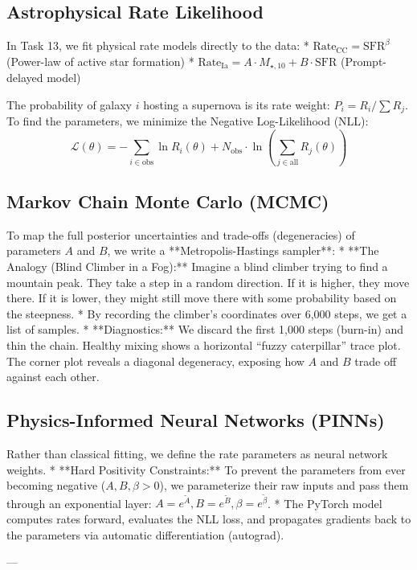 \documentclass[11pt,a4paper]{article}
\begin{document}
\subsection{Astrophysical Rate Likelihood}
In Task 13, we fit physical rate models directly to the data:
*   $\text{Rate}_{\text{CC}} = \text{SFR}^\beta$ (Power-law of active star formation)
*   $\text{Rate}_{\text{Ia}} = A \cdot M_{\star, 10} + B \cdot \text{SFR}$ (Prompt-delayed model)

The probability of galaxy $i$ hosting a supernova is its rate weight: $P_i = R_i / \sum R_j$.
To find the parameters, we minimize the Negative Log-Likelihood (NLL):
$$\mathcal{L}(\theta) = -\sum_{i \in \text{obs}} \ln R_i(\theta) + N_{\text{obs}} \cdot \ln \left(\sum_{j \in \text{all}} R_j(\theta)\right)$$

\subsection{Markov Chain Monte Carlo (MCMC)}
To map the full posterior uncertainties and trade-offs (degeneracies) of parameters $A$ and $B$, we write a **Metropolis-Hastings sampler**:
*   **The Analogy (Blind Climber in a Fog):** Imagine a blind climber trying to find a mountain peak. They take a step in a random direction. If it is higher, they move there. If it is lower, they might still move there with some probability based on the steepness.
*   By recording the climber's coordinates over 6,000 steps, we get a list of samples. 
*   **Diagnostics:** We discard the first 1,000 steps (burn-in) and thin the chain. Healthy mixing shows a horizontal ``fuzzy caterpillar'' trace plot. The corner plot reveals a diagonal degeneracy, exposing how $A$ and $B$ trade off against each other.

\subsection{Physics-Informed Neural Networks (PINNs)}
Rather than classical fitting, we define the rate parameters as neural network weights. 
*   **Hard Positivity Constraints:** To prevent the parameters from ever becoming negative ($A, B, \beta > 0$), we parameterize their raw inputs and pass them through an exponential layer: $A = e^{\tilde{A}}, B = e^{\tilde{B}}, \beta = e^{\tilde{\beta}}$.
*   The PyTorch model computes rates forward, evaluates the NLL loss, and propagates gradients back to the parameters via automatic differentiation (autograd).

---
\end{document}
